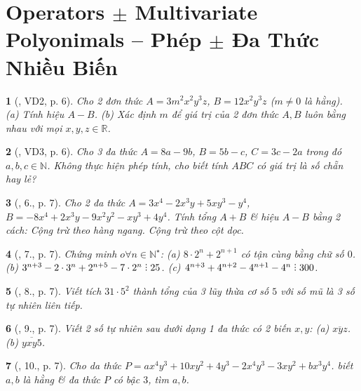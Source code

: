 \documentclass{article}
\newtheorem{baitoan}{}
\DeclareRobustCommand{\divby}{%
	\mathrel{\vbox{\baselineskip.65ex\lineskiplimit0pt\hbox{.}\hbox{.}\hbox{.}}}%
}
\begin{document}

\section{Operators $\pm$ Multivariate Polyonimals -- Phép $\pm$ Đa Thức Nhiều Biến}

\begin{baitoan}[\cite{Tuyen_Toan_8}, VD2, p. 6]
	Cho 2 đơn thức $A = 3m^2x^2y^3z$, $B = 12x^2y^3z$ ($m\ne0$ là hằng). (a) Tính hiệu $A - B$. (b) Xác định $m$ để giá trị của 2 đơn thức $A,B$ luôn bằng nhau với mọi $x,y,z\in\mathbb{R}$.
\end{baitoan}

\begin{baitoan}[\cite{Tuyen_Toan_8}, VD3, p. 6]
	Cho 3 đa thức $A = 8a - 9b$, $B = 5b - c$, $C = 3c - 2a$ trong đó $a,b,c\in\mathbb{N}$. Không thực hiện phép tính, cho biết tính $ABC$ có giá trị là số chẵn hay lẻ?
\end{baitoan}

\begin{baitoan}[\cite{Tuyen_Toan_8}, 6., p. 7]
	Cho 2 đa thức $A = 3x^4 - 2x^3y + 5xy^3 - y^4$, $B = -8x^4 + 2x^3y - 9x^2y^2 - xy^3 + 4y^4$. Tính tổng $A + B$ \& hiệu $A - B$ bằng 2 cách: Cộng trừ theo hàng ngang. Cộng trừ theo cột dọc.
\end{baitoan}

\begin{baitoan}[\cite{Tuyen_Toan_8}, 7., p. 7]
	Chứng minh $o\forall n\in\mathbb{N}^\star$: (a) $8\cdot2^n + 2^{n+1}$ có tận cùng bằng chữ số $0$. (b) $3^{n+3} - 2\cdot3^n + 2^{n+5} - 7\cdot2^n\divby25$. (c) $4^{n+3} + 4^{n+2} - 4^{n+1} - 4^n\divby300$. 
\end{baitoan}

\begin{baitoan}[\cite{Tuyen_Toan_8}, 8., p. 7]
	Viết tích $31\cdot5^2$ thành tổng của 3 lũy thừa cơ số $5$ với số mũ là 3 số tự nhiên liên tiếp.
\end{baitoan}

\begin{baitoan}[\cite{Tuyen_Toan_8}, 9., p. 7]
	Viết 2 số tự nhiên sau dưới dạng 1 đa thức có 2 biến $x,y$: (a) $\overline{xyz}$. (b) $\overline{yxy5}$.
\end{baitoan}

\begin{baitoan}[\cite{Tuyen_Toan_8}, 10., p. 7]
	Cho da thức $P = ax^4y^3 + 10xy^2 + 4y^3 - 2x^4y^3 - 3xy^2 + bx^3y^4$. biết $a,b$ là hằng \& đa thức $P$ có bậc $3$, tìm $a,b$.
\end{baitoan}
\end{document}
